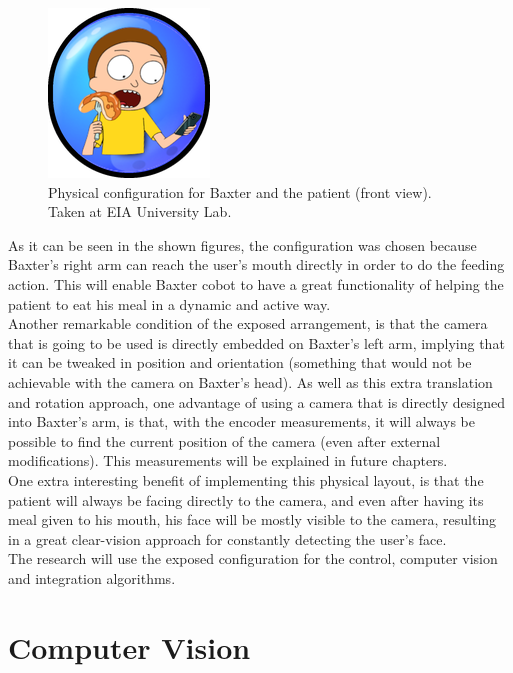 \documentclass[11pt]{report} %
\begin{document}
\begin{figure}[H]
    \centering
    \includegraphics[width=0.3\linewidth]{assets/imgs/TODO.png}
    \caption{Physical configuration for Baxter and the patient (front view). Taken at EIA University Lab.} 
    \label{fig_baxter_configuration_2}
\end{figure}

As it can be seen in the shown figures, the configuration was chosen because Baxter's right arm can reach the user's mouth directly in order to do the feeding action. This will enable Baxter cobot to have a great functionality of helping the patient to eat his meal in a dynamic and active way.\\

Another remarkable condition of the exposed arrangement, is that the camera that is going to be used is directly embedded on Baxter's left arm, implying that it can be tweaked in position and orientation (something that would not be achievable with the camera on Baxter's head). As well as this extra translation and rotation approach, one advantage of using a camera that is directly designed into Baxter's arm, is that, with the encoder measurements, it will always be possible to find the current position of the camera (even after external modifications). This measurements will be explained in future chapters.\\

One extra interesting benefit of implementing this physical layout, is that the patient will always be facing directly to the camera, and even after having its meal given to his mouth, his face will be mostly visible to the camera, resulting in a great clear-vision approach for constantly detecting the user's face.\\

The research will use the exposed configuration for the control, computer vision and integration algorithms.\\

\chapter{Computer Vision}
\end{document}
